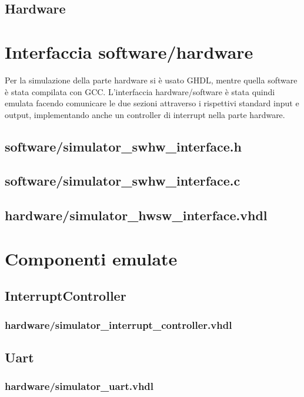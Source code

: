 \documentclass [11pt,a4paper,oneside]{paper}
\newcommand{\inputVHDL}[1]{}
\newcommand{\inputC}[1]{}
\begin{document}
\subsection{Hardware}
\inputVHDL{hardware/hardware.vhdl}


\section{Interfaccia software/hardware}
Per la simulazione della parte hardware si è usato GHDL, mentre quella software
è stata compilata con GCC. L'interfaccia hardware/software è stata quindi emulata
facendo comunicare le due sezioni attraverso i rispettivi standard input e output,
implementando anche un controller di interrupt nella parte hardware.

\subsection{software/simulator\_swhw\_interface.h}
\inputC{software/simulator_swhw_interface.h}

\subsection{software/simulator\_swhw\_interface.c}
\inputC{software/simulator_swhw_interface.c}

\subsection{hardware/simulator\_hwsw\_interface.vhdl}
\inputVHDL{hardware/simulator_hwsw_interface.vhdl}


\section{Componenti emulate}
\subsection{InterruptController}
\subsubsection{hardware/simulator\_interrupt\_controller.vhdl}
\inputVHDL{hardware/simulator_interrupt_controller.vhdl}

\subsection{Uart}
\subsubsection{hardware/simulator\_uart.vhdl}
\inputVHDL{hardware/simulator_uart.vhdl}
\end{document}
